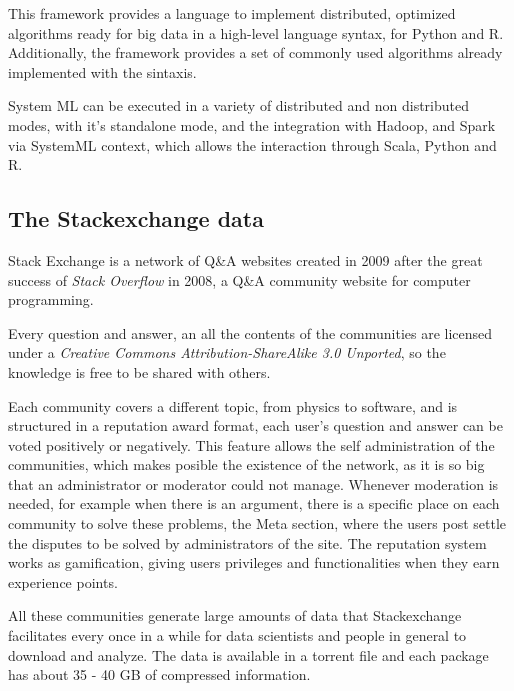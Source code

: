 \documentclass[11pt]{article} %
\begin{document}
    This framework provides a language to implement distributed, optimized algorithms ready for big data in a high-level language syntax, for Python and R. Additionally, the framework provides a set of commonly used algorithms already implemented with the sintaxis.

    System ML can be executed in a variety of distributed and non distributed modes, with it's standalone mode, and the integration with Hadoop, and Spark via SystemML context, which allows the interaction through Scala, Python and R.


  \subsection{The Stackexchange data}
  \label{subsec:data_structure}


    Stack Exchange is a network of Q\&A websites created in 2009 after the great success of \emph{Stack Overflow} in 2008, a Q\&A community website for computer programming.

    Every question and answer, an all the contents of the communities are licensed under a \emph{Creative Commons Attribution-ShareAlike 3.0 Unported}, so the knowledge is free to be shared with others.

    Each community covers a different topic, from physics to software, and is structured in a reputation award format, each user's question and answer can be voted positively or negatively. This feature allows the self administration of the communities, which makes posible the existence of the network, as it is so big that an administrator or moderator could not manage. Whenever moderation is needed, for example when there is an argument, there is a specific place on each community to solve these problems, the Meta section, where the users post settle the disputes to be solved by administrators of the site. The reputation system works as gamification, giving users privileges and functionalities when they earn experience points.

    All these communities generate large amounts of data that Stackexchange facilitates every once in a while for data scientists and people in general to download and analyze. The data is available in a torrent file and each package has about 35 - 40 GB of compressed information.
\end{document}
